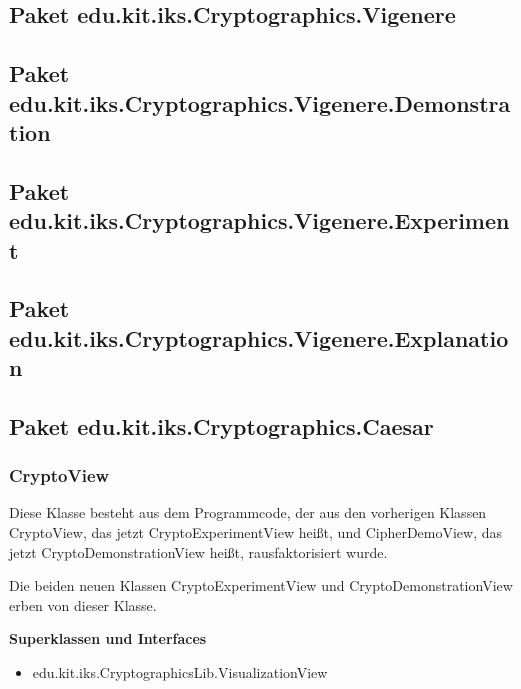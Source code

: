 \documentclass{article}
\begin{document}
  \subsection{Paket edu.kit.iks.Cryptographics.Vigenere}
	

  \subsection{Paket edu.kit.iks.Cryptographics.Vigenere.Demonstration}
	

  \subsection{Paket edu.kit.iks.Cryptographics.Vigenere.Experiment}

  \subsection{Paket edu.kit.iks.Cryptographics.Vigenere.Explanation}

  \subsection{Paket edu.kit.iks.Cryptographics.Caesar}
   \subsubsection{CryptoView}
          Diese Klasse besteht aus dem Programmcode, der aus den vorherigen Klassen CryptoView, das jetzt CryptoExperimentView heißt,
          und CipherDemoView, das jetzt CryptoDemonstrationView heißt, rausfaktorisiert wurde.
          
          Die beiden neuen Klassen CryptoExperimentView und CryptoDemonstrationView erben von dieser Klasse.\newline
           
    \textbf{Superklassen und Interfaces}
      \begin{itemize}
        \item  edu.kit.iks.CryptographicsLib.VisualizationView
      \end{itemize}
           
\end{document}
